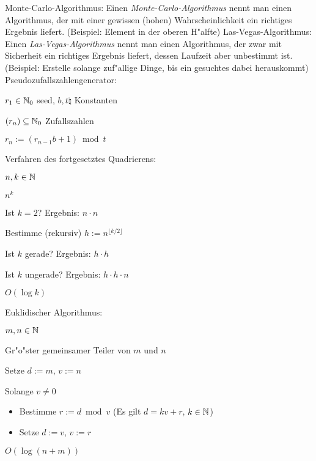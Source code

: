  Monte-Carlo-Algorithmus:{
  Einen \textit{Monte-Carlo-Algorithmus} nennt man einen Algorithmus, der
  mit einer gewissen (hohen) Wahrscheinlichkeit ein richtiges
  Ergebnis liefert. (Beispiel: Element in der oberen H"alfte)
}
 Las-Vegas-Algorithmus:{
  Einen \textit{Las-Vegas-Algorithmus} nennt man einen Algorithmus, der
  zwar mit Sicherheit ein richtiges Ergebnis liefert, dessen Laufzeit aber
  unbestimmt ist. (Beispiel: Erstelle solange zuf"allige Dinge, bis ein
  gesuchtes dabei herauskommt)
}
\algorithm Pseudozufallszahlengenerator:{
  \given $r_1\in\mathbb N_0$ seed, $b,t\natural$ Konstanten
  
  \aim $(r_n)\subseteq\mathbb N_0$ Zufallszahlen
  
  \begin{proc}
    \item $r_n:=(r_{n-1}b+1) \bmod t$
  \end{proc}
}
\algorithm Verfahren des fortgesetztes Quadrierens:{
  \given $n,k\in\mathbb N$
  
  \aim $n^k$
  
  \begin{proc}
    \item Ist $k=2$? Ergebnis: $n\cdot n$
    \item Bestimme (rekursiv) $h:=n^{\lfloor k/2\rfloor}$
    \item Ist $k$ gerade? Ergebnis: $h\cdot h$
    \item Ist $k$ ungerade? Ergebnis: $h\cdot h\cdot n$
  \end{proc}
  
  \cpx $O(\log k)$
}
\algorithm Euklidischer Algorithmus:{
  \given $m,n\in\mathbb N$
  
  \aim Gr"o"ster gemeinsamer Teiler von $m$ und $n$
  
  \begin{proc}
    \item Setze $d:=m$, $v:=n$
    \item Solange $v \ne 0$
      \begin{itemize}
        \item Bestimme $r:=d \bmod v$ (Es gilt $d=kv+r$, $k\in\mathbb N$)
        \item Setze $d:=v$, $v:=r$
      \end{itemize}
  \end{proc}
  
  \cpx $O(\log(n+m))$
}
